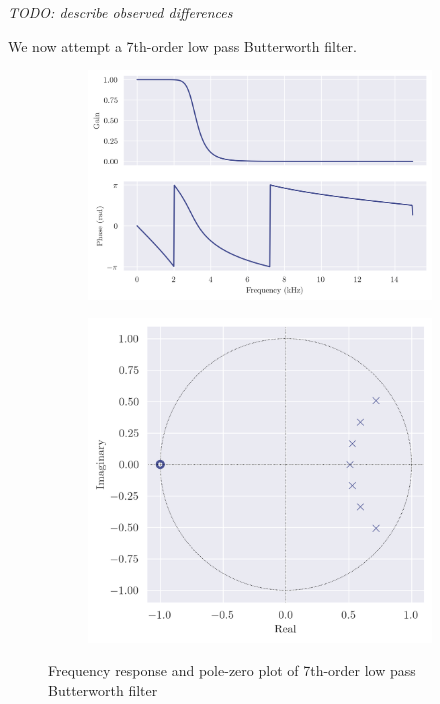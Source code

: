 \textit{TODO: describe observed differences}

\newpage

We now attempt a 7th-order low pass Butterworth filter.

\begin{figure}[ht]
    \centering
    \begin{subfigure}[b]{0.58\textwidth}
        \centering
        \includegraphics[width=\textwidth]{images/q8_7th_freqz.png}
    \end{subfigure}
    \hfill
    \begin{subfigure}[b]{0.41\textwidth}
        \centering
        \includegraphics[width=\textwidth]{images/q8_7th_zp.png}
    \end{subfigure}
    \caption{Frequency response and pole-zero plot of 7th-order low pass Butterworth filter}
\end{figure}

